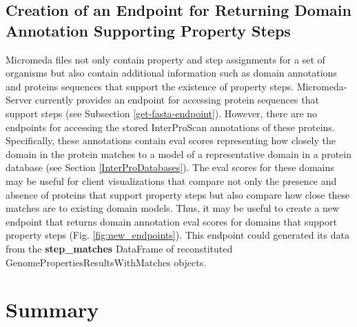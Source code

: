 \subsection{Creation of an Endpoint for Returning Domain Annotation Supporting 
Property Steps} \label{e-value-endpoint}

Micromeda files not only contain property and step assignments for a set of 
organisms but also contain additional information such as domain annotations and 
proteins sequences that support the existence of property steps. 
Micromeda-Server currently provides an endpoint for accessing protein sequences 
that support steps (see Subsection \ref{get-fasta-endpoint}). However, there are 
no endpoints for accessing the stored InterProScan annotations of these 
proteins. Specifically, these annotations contain \gls{eval} scores representing 
how closely the domain in the protein matches to a model of a representative 
domain in a protein database (see Section \ref{InterProDatabases}). The 
\gls{eval} scores for these domains may be useful for client visualizations that 
compare not only the presence and absence of proteins that support property 
steps but also compare how close these matches are to existing domain models. 
Thus, it may be useful to create a new endpoint that returns domain annotation 
\gls{eval} scores for domains that support property steps (Fig. 
\ref{fig:new_endpoints}). This endpoint could generated its data from the 
\textbf{step\_matches} DataFrame of reconstituted 
GenomePropertiesResultsWithMatches objects.

\section{Summary} \label{server-summary}

